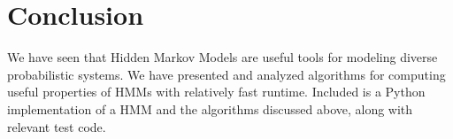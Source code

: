 

\section{Conclusion}
We have seen that Hidden Markov Models are useful tools for modeling diverse probabilistic systems. We have presented and analyzed algorithms for computing useful properties of HMMs with relatively fast runtime. Included is a Python implementation of a HMM and the algorithms discussed above, along with relevant test code.